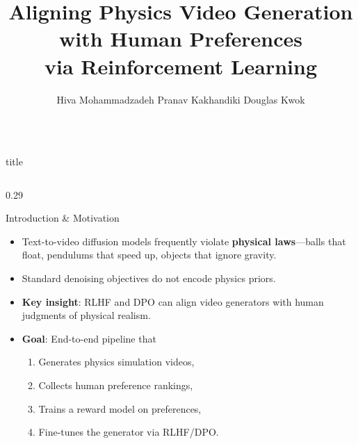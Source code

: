 \documentclass[final]{beamer}
\title{Aligning Physics Video Generation with Human Preferences\\via Reinforcement Learning}
\author{Hiva Mohammadzadeh \quad Pranav Kakhandiki \quad Douglas Kwok}
\institute{CS234: Reinforcement Learning, Stanford University}
\begin{document}
\begin{frame}[t,plain]
\begin{minipage}[t][0.98\textheight]{\textwidth}

\begin{columns}[t,onlytextwidth]
  \begin{column}{\textwidth}
    \centering
    \vspace{-0.02cm}
    \begin{beamercolorbox}[wd=\textwidth,center,rounded=true,shadow=false]{title}
      \vspace{0.05cm}
      {\LARGE \textbf{\inserttitle}\par}
      \vspace{0.15cm}
      {\Large \insertauthor\par}
      \vspace{0.15cm}
      {\large \insertinstitute\par}
      \vspace{0.2cm}
    \end{beamercolorbox}
    \vspace{0.15cm}
  \end{column}
\end{columns}

\begin{columns}[t,onlytextwidth]

\begin{column}{0.29\textwidth}

  \begin{block}{Introduction \& Motivation}
    \begin{itemize}
      \item Text-to-video diffusion models frequently violate
            \textbf{physical laws}---balls that float, pendulums
            that speed up, objects that ignore gravity.
      \item Standard denoising objectives do not encode physics priors.
      \item \textbf{Key insight}: RLHF and DPO can align video
            generators with human judgments of physical realism.
      \item \textbf{Goal}: End-to-end pipeline that
      \begin{enumerate}
        \item[\textbf{1.}] Generates physics simulation videos,
        \item[\textbf{2.}] Collects human preference rankings,
        \item[\textbf{3.}] Trains a reward model on preferences,
        \item[\textbf{4.}] Fine-tunes the generator via RLHF/DPO.
      \end{enumerate}
    \end{itemize}
  \end{block}


\end{column}
\end{columns}
\end{minipage}
\end{frame}
\end{document}

